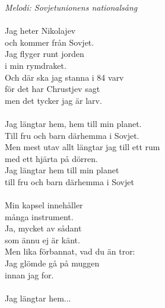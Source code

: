{\footnotesize\textit{Melodi: Sovjetunionens nationalsång}}\\
\\
Jag heter Nikolajev\\
och kommer från Sovjet.\\
Jag flyger runt jorden\\
i min rymdraket.\\
Och där ska jag stanna i 84 varv\\
för det har Chrustjev sagt\\
men det tycker jag är larv.\\
\\
Jag längtar hem, hem till min planet.\\
Till fru och barn därhemma i Sovjet.\\
Men mest utav allt längtar jag till ett rum\\
med ett hjärta på dörren.\\
Jag längtar hem till min planet\\
till fru och barn därhemma i Sovjet\\
\\
Min kapsel innehåller\\
många instrument.\\
Ja, mycket av sådant\\
som ännu ej är känt.\\
Men lika förbannat, vad du än tror:\\
Jag glömde gå på muggen\\
innan jag for.\\
\\
Jag längtar hem...
